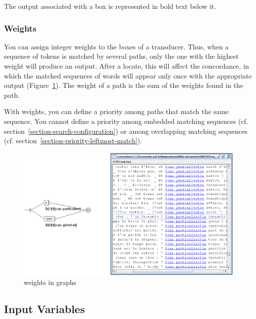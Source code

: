 \noindent The output associated with a box is represented in bold text below it.
\subsubsection{Weights}


You can assign integer weights to the boxes of a transducer.
Thus, when a sequence of tokens is matched by several paths, 
only the one with the highest weight will produce an output. 
After a locate, this will affect the concordance, in which 
the matched sequences of words will appear only once with the appropriate output
(Figure~\ref{fig-weights-in-graphs}). The weight of a path is the sum of the weights found in the path.

\noindent With weights, you can define a priority among paths that match the same sequence.
You cannot define a priority among embedded matching sequences (cf. section~\ref{section-search-configuration})
 or among overlapping matching sequences (cf. section~\ref{section-priority-leftmost-match}).

\bigskip
\begin{figure}[h!]
\begin{center}
\includegraphics[width=14.5cm]{resources/img/fig5-15b.png}
\caption{weights in graphs \label{fig-weights-in-graphs}}
\end{center}
\end{figure}

\subsection{Input Variables}
\label{section-using-variables}
\index{\verb+$+}

